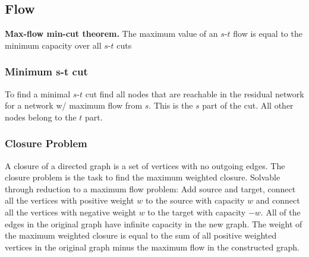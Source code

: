 \subsection{Flow}

\textbf{Max-flow min-cut theorem.} The maximum value of an $s$-$t$ flow is
equal to the minimum capacity over all $s$-$t$ cuts


\subsubsection{Minimum s-t cut}

To find a minimal $s$-$t$ cut find all nodes that are reachable in the
residual network for a network w/ maximum flow from $s$.  This is the
$s$ part of the cut.  All other nodes belong to the $t$ part.

\subsubsection{Closure Problem}

A closure of a directed graph is a set of vertices with no outgoing
edges.  The closure problem is the task to find the maximum weighted
closure.  Solvable through reduction to a maximum flow problem: Add
source and target, connect all the vertices with positive weight $w$
to the source with capacity $w$ and connect all the vertices with
negative weight $w$ to the target with capacity $-w$.  All of the
edges in the original graph have infinite capacity in the new
graph.  The weight of the maximum weighted closure is equal to the sum
of all positive weighted vertices in the original graph minus the
maximum flow in the constructed graph.

